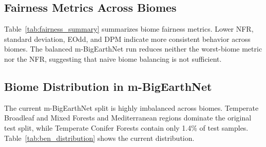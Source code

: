\subsection{Fairness Metrics Across Biomes}
Table~\ref{tab:fairness_summary} summarizes biome fairness metrics. Lower NFR, standard deviation, EOdd, and DPM indicate more consistent behavior across biomes. The balanced m-BigEarthNet run reduces neither the worst-biome metric nor the NFR, suggesting that naive biome balancing is not sufficient.

\begin{table}[t]
\centering
\caption{Current biome fairness summary for Prithvi-EO-2.0 linear probing. Worst-metric is worst-biome macro-F1 for classification and worst-biome mIoU for segmentation.}
\label{tab:fairness_summary}
\end{table}

\subsection{Biome Distribution in m-BigEarthNet}
The current m-BigEarthNet split is highly imbalanced across biomes. Temperate Broadleaf and Mixed Forests and Mediterranean regions dominate the original test split, while Temperate Conifer Forests contain only 1.4\% of test samples. Table~\ref{tab:ben_distribution} shows the current distribution.

